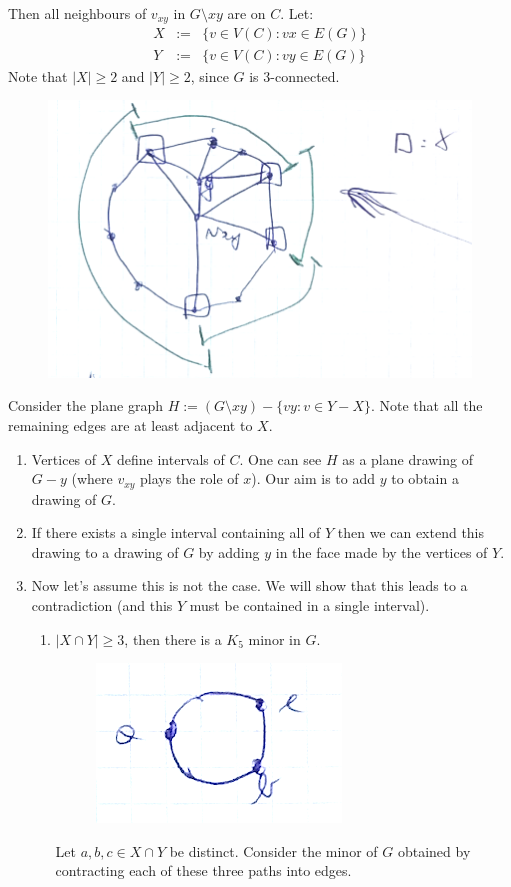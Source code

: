 \begin{enumerate}
\begin{enumerate}
Then all neighbours of $v_{xy}$ in $G \setminus xy$ are on $C$. Let:
						\begin{eqnarray}
							X &:=& \{ v \in V(C) : vx \in E(G)\}\\
							Y &:=& \{ v \in V(C) : vy \in E(G) \}
						\end{eqnarray}
						Note that $|X| \geq 2$ and $|Y| \geq 2$, since $G$ is 3-connected.\\
						\begin{figure}[h]
	\center
	\includegraphics[width=0.3\linewidth]{img/4-2.png}
\end{figure}

Consider the plane graph $H := (G \setminus xy) - \{ vy : v \in Y -X \}$. Note that all the remaining edges are at least adjacent to $X$.
						\begin{enumerate}
							\item Vertices of $X$ define intervals of $C$. One can see $H$ as a plane drawing of $G - y$ (where $v_{xy}$ plays the role of $x$). Our aim is to add $y$ to obtain a drawing of $G$.
							\item If there exists a single interval containing all of $Y$ then we can extend this drawing to a drawing  of $G$ by adding $y$ in the face made by the vertices of $Y$.
							\item Now let's assume this is not the case. We will show that this leads to a contradiction (and this $Y$ must be contained in a single interval).
								\begin{enumerate}
									\item $|X \cap Y| \geq 3$, then there is a $K_5$ minor in $G$.
									\begin{figure}[h]
	\center
	\includegraphics[width=0.3\linewidth]{img/4-3.png}
\end{figure}

Let $a,b,c \in X \cap Y$ be distinct. Consider the minor of $G$ obtained by contracting each of these three paths into edges.
			

\end{enumerate}
\end{enumerate}
\end{enumerate}
\end{enumerate}

